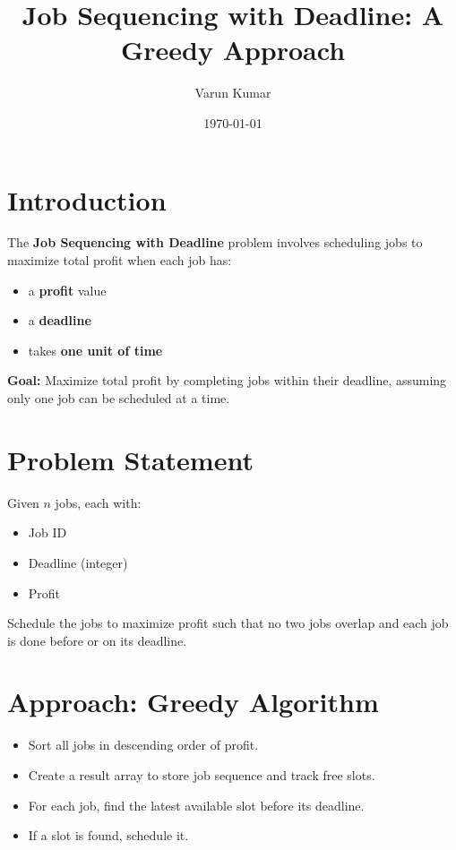 \documentclass[14pt]{extarticle}
\title{Job Sequencing with Deadline: A Greedy Approach}
\author{Varun Kumar}
\date{\today}
\begin{document}
\maketitle
\newpage
\tableofcontents

\lstlistoflistings
\listofalgorithms
\newpage

\section{Introduction}
The \textbf{Job Sequencing with Deadline} problem involves scheduling jobs to maximize total profit when each job has:
\begin{itemize}
    \item a \textbf{profit} value
    \item a \textbf{deadline}
    \item takes \textbf{one unit of time}
\end{itemize}

\textbf{Goal:} Maximize total profit by completing jobs within their deadline, assuming only one job can be scheduled at a time.

\section{Problem Statement}
Given $n$ jobs, each with:
\begin{itemize}
    \item Job ID
    \item Deadline (integer)
    \item Profit
\end{itemize}
Schedule the jobs to maximize profit such that no two jobs overlap and each job is done before or on its deadline.

\section{Approach: Greedy Algorithm}
\begin{itemize}
    \item Sort all jobs in descending order of profit.
    \item Create a result array to store job sequence and track free slots.
    \item For each job, find the latest available slot before its deadline.
    \item If a slot is found, schedule it.
\end{itemize}

\end{document}
